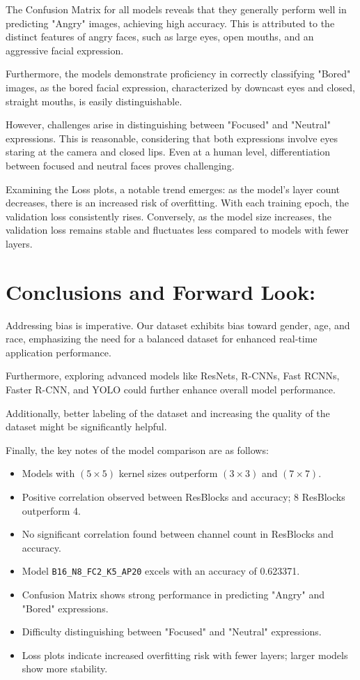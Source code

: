 \documentclass[]{report}
\begin{document}
The Confusion Matrix for all models reveals that they generally perform well in predicting "Angry" images, achieving high accuracy. This is attributed to the distinct features of angry faces, such as large eyes, open mouths, and an aggressive facial expression.

Furthermore, the models demonstrate proficiency in correctly classifying "Bored" images, as the bored facial expression, characterized by downcast eyes and closed, straight mouths, is easily distinguishable.

However, challenges arise in distinguishing between "Focused" and "Neutral" expressions. This is reasonable, considering that both expressions involve eyes staring at the camera and closed lips. Even at a human level, differentiation between focused and neutral faces proves challenging.

Examining the Loss plots, a notable trend emerges: as the model's layer count decreases, there is an increased risk of overfitting. With each training epoch, the validation loss consistently rises. Conversely, as the model size increases, the validation loss remains stable and fluctuates less compared to models with fewer layers.


\section{Conclusions and Forward Look:}


Addressing bias is imperative. Our dataset exhibits bias toward gender, age, and race, emphasizing the need for a balanced dataset for enhanced real-time application performance.

Furthermore, exploring advanced models like ResNets, R-CNNs, Fast RCNNs, Faster R-CNN, and YOLO could further enhance overall model performance.


Additionally, better labeling of the dataset and increasing the quality of the dataset might be significantly helpful.

Finally, the key notes of the model comparison are as follows:

\begin{itemize}
    \item Models with $(5\times5)$ kernel sizes outperform $(3\times3)$ and $(7\times7)$.
    \item Positive correlation observed between ResBlocks and accuracy; 8 ResBlocks outperform 4.
    \item No significant correlation found between channel count in ResBlocks and accuracy.
    \item Model \texttt{B16\_N8\_FC2\_K5\_AP20} excels with an accuracy of 0.623371.
    \item Confusion Matrix shows strong performance in predicting "Angry" and "Bored" expressions.
    \item Difficulty distinguishing between "Focused" and "Neutral" expressions.
    \item Loss plots indicate increased overfitting risk with fewer layers; larger models show more stability.
\end{itemize}
\end{document}
